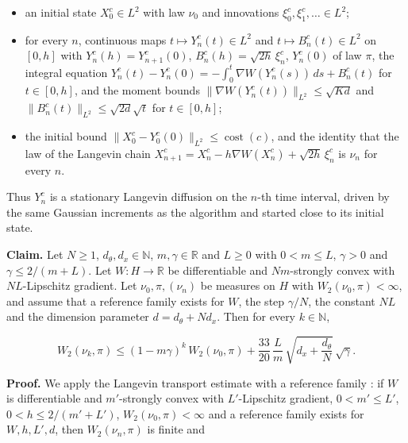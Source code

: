 \documentclass[11pt,a4paper]{report}
\begin{document}
\begin{itemize}


\item an initial state \(X_0^c\in L^2\) with law \(\nu_0\) and innovations \(\xi_0^c,\xi_1^c,\dots\in L^2\);

\item for every \(n\), continuous maps \(t\mapsto Y_n^c(t)\in L^2\) and \(t\mapsto B_n^c(t)\in L^2\) on \([0,h]\) with \(Y_n^c(h)=Y_{n+1}^c(0)\), \(B_n^c(h)=\sqrt{2h}\,\xi_n^c\), \(Y_n^c(0)\) of law \(\pi\), the integral equation \(Y_n^c(t)-Y_n^c(0)=-\int_0^t\nabla W(Y_n^c(s))\,ds+B_n^c(t)\) for \(t\in[0,h]\), and the moment bounds \(\|\nabla W(Y_n^c(t))\|_{L^2}\le\sqrt{Kd}\) and \(\|B_n^c(t)\|_{L^2}\le\sqrt{2d}\sqrt t\) for \(t\in[0,h]\);

\item the initial bound \(\|X_0^c-Y_0^c(0)\|_{L^2}\le\operatorname{cost}(c)\), and the identity that the law of the Langevin chain \(X_{n+1}^c=X_n^c-h\nabla W(X_n^c)+\sqrt{2h}\,\xi_n^c\) is \(\nu_n\) for every \(n\).

\end{itemize}



Thus \(Y_n^c\) is a stationary Langevin diffusion on the \(n\)-th time interval, driven by the same Gaussian increments as the algorithm and started close to its initial state.




\textbf{Claim.} Let \(N\ge1\), \(d_\theta,d_x\in\mathbb N\), \(m,\gamma\in\mathbb R\) and \(L\ge0\) with \(0<m\le L\), \(\gamma>0\) and \(\gamma\le2/(m+L)\). Let \(W:H\to\mathbb R\) be differentiable and \(Nm\)-strongly convex with \(NL\)-Lipschitz gradient. Let \(\nu_0,\pi,(\nu_n)\) be measures on \(H\) with \(W_2(\nu_0,\pi)<\infty\), and assume that a reference family exists for \(W\), the step \(\gamma/N\), the constant \(NL\) and the dimension parameter \(d=d_\theta+Nd_x\). Then for every \(k\in\mathbb N\),


\[W_2(\nu_k,\pi)\le(1-m\gamma)^k\,W_2(\nu_0,\pi)+\frac{33}{20}\,\frac Lm\,\sqrt{d_x+\frac{d_\theta}N}\,\sqrt\gamma .\]


\textbf{Proof.} We apply the Langevin transport estimate with a reference family \cite[Section~3.47.4]{LangevinLean2026ULASC}: if \(W\) is differentiable and \(m'\)-strongly convex with \(L'\)-Lipschitz gradient, \(0<m'\le L'\), \(0<h\le2/(m'+L')\), \(W_2(\nu_0,\pi)<\infty\) and a reference family exists for \(W,h,L',d\), then \(W_2(\nu_n,\pi)\) is finite and
\end{document}

